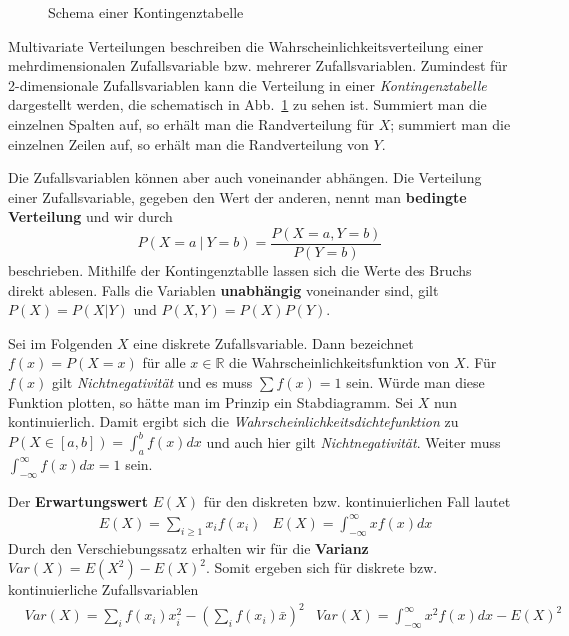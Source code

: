 \begin{figure}[hb]
	\centering
	
	\caption[Schema Kontingenztabelle]{Schema einer Kontingenztabelle}
	\label{fig:contingency_ex}
\end{figure}

Multivariate Verteilungen beschreiben die Wahrscheinlichkeitsverteilung einer mehrdimensionalen Zufallsvariable bzw. mehrerer Zufallsvariablen. Zumindest für 2-dimensionale Zufallsvariablen kann die Verteilung in einer \textit{Kontingenztabelle} dargestellt werden, die schematisch in Abb.~\ref{fig:contingency_ex} zu sehen ist. Summiert man die einzelnen Spalten auf, so erhält man die Randverteilung für \(X\); summiert man die einzelnen Zeilen auf, so erhält man die Randverteilung von \(Y\).

Die Zufallsvariablen können aber auch voneinander abhängen. Die Verteilung einer Zufallsvariable, gegeben den Wert der anderen, nennt man \textbf{bedingte Verteilung} und wir durch
\[
	P(X=a\ |\ Y=b)=\frac{P(X=a,Y=b)}{P(Y=b)}
\]
beschrieben. Mithilfe der Kontingenztablle lassen sich die Werte des Bruchs direkt ablesen. Falls die Variablen \textbf{unabhängig} voneinander sind, gilt \(P(X) = P(X|Y)\) und \(P(X,Y) = P(X)P(Y)\).

Sei im Folgenden \(X\) eine diskrete Zufallsvariable. Dann bezeichnet \(f(x)=P(X=x)\) für alle \(x\in\mathbb{R}\) die Wahrscheinlichkeitsfunktion von \(X\). Für \(f(x)\) gilt \textit{Nichtnegativität} und es muss \(\sum f(x) = 1\) sein. Würde man diese Funktion plotten, so hätte man im Prinzip ein Stabdiagramm.
Sei \(X\) nun kontinuierlich. Damit ergibt sich die \textit{Wahrscheinlichkeitsdichtefunktion} zu \(P(X\in[a,b])=\int_{a}^{b} f(x)dx\) und auch hier gilt \textit{Nichtnegativität}. Weiter muss \(\int_{-\infty}^{\infty} f(x)dx = 1\) sein.

Der \textbf{Erwartungswert} \(E(X)\) für den diskreten bzw. kontinuierlichen Fall lautet
\begin{align*}
	&E(X)=\sum_{i\geq 1} x_i f(x_i) &E(X) = \int_{-\infty}^{\infty} xf(x)dx
\end{align*}
Durch den Verschiebungssatz erhalten wir für die \textbf{Varianz} \(Var(X)=E(X^2)-E(X)^2\). Somit ergeben sich für diskrete bzw. kontinuierliche Zufallsvariablen
\begin{align*}
	&Var(X)=\sum_i f(x_i) x_i^2 - (\sum_i f(x_i) \bar{x})^2 &Var(X)=\int_{-\infty}^{\infty} x^2f(x)dx - E(X)^2
\end{align*}

